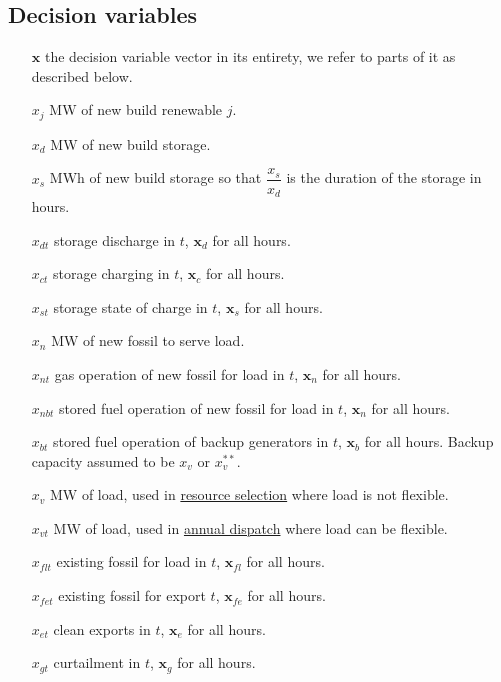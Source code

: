 \documentclass[9pt, oneside]{article}
\numberwithin{equation}{subsubsection}
\begin{document}
\subsection{Decision variables}\label{subsec:decision-variables}
\begin{multicols}{2}
	{\small
		\begin{itemize}
			\item[$\mathbf{x}$] the decision variable vector in its entirety, we refer to parts of it as described below.
			\item[$x_j$] MW of new build renewable $j$.
			\item[$x_d$] MW of new build storage.
			\item[$x_s$] MWh of new build storage so that $\dfrac{x_s}{x_d}$ is the duration of the storage in hours.
			\item[$x_{dt}$] storage discharge in $t$, $\mathbf{x}_{d}$ for all hours.
			\item[$x_{ct}$] storage charging in $t$, $\mathbf{x}_{c}$ for all hours.
			\item[$x_{st}$] storage state of charge in $t$, $\mathbf{x}_{s}$ for all hours.
			\item[$x_{n}$] MW of new fossil to serve load.
			\item[$x_{nt}$] gas operation of new fossil for load in $t$, $\mathbf{x}_{n}$ for all hours.
			\item[$x_{nbt}$] stored fuel operation of new fossil for load in $t$, $\mathbf{x}_{n}$ for all hours.
			\item[$x_{bt}$] stored fuel operation of backup generators in $t$, $\mathbf{x}_{b}$ for all hours.
			      Backup capacity assumed to be $x_v$ or $x_v^{**}$.
			\item[$x_v$] MW of load, used in \hyperref[sec:res]{resource selection} where load is not flexible.
			\item[$x_{vt}$] MW of load, used in \hyperref[sec:anndisp]{annual dispatch} where load can be flexible.
			\item[$x_{flt}$] existing fossil for load in $t$, $\mathbf{x}_{fl}$ for all hours.
			\item[$x_{fet}$] existing fossil for export $t$, $\mathbf{x}_{fe}$ for all hours.
			\item[$x_{et}$] clean exports in $t$, $\mathbf{x}_{e}$ for all hours.
			\item[$x_{gt}$] curtailment in $t$, $\mathbf{x}_{g}$ for all hours.
		\end{itemize}
	}
\end{multicols}
\end{document}
